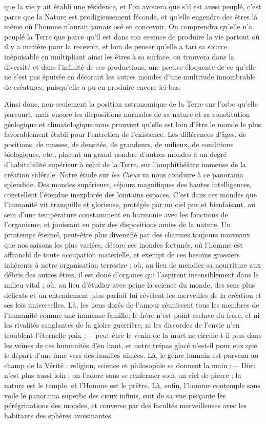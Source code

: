 \documentclass[a4paper, 11pt, oneside]{article}
\begin{document}
que la vie y ait établi une résidence, et l'on avouera que s'il est aussi peuplé, c'est parce que la Nature est prodigieusement féconde, et qu'elle engendre des êtres là même où l'homme n'aurait jamais osé en concevoir. On comprendra qu'elle n'a peuplé la Terre que parce qu'il est dans son essence de produire la vie partout où il y a matière pour la recevoir, et loin de penser qu'elle a tari sa source inépuisable en multipliant ainsi les êtres à sa surface, on trouvera dans la diversité et dans l'infinité de ses productions, une preuve éloquente de ce qu'elle ne s'est pas épuisée en décorant les autres mondes d'une multitude innombrable de créatures, puisqu'elle a pu en produire encore ici-bas.

Ainsi donc, non-seulement la position astronomique de la Terre sur l'orbe qu'elle parcourt, mais encore les dispositions normales de sa nature et sa constitution géologique et climatologique nous prouvent qu'elle est loin d'être le monde le plus favorablement établi pour l'entretien de l'existence. Les différences d'âges, de positions, de masses, de densités, de grandeurs, de milieux, de conditions biologiques, etc., placent un grand nombre d'autres mondes à un degré d'habitabilité supérieur à celui de la Terre, sur l'amphithéâtre immense de la création sidérale. Notre étude sur \emph{les Cieux} va nous conduire à ce panorama splendide. Des mondes supérieurs, séjours magnifiques des hautes intelligences, constellent l'étendue inexplorée des lointains espaces. C'est dans ces mondes que l'humanité vit tranquille et glorieuse, protégée par un ciel pur et bienfaisant, au sein d'une température constamment en harmonie avec les fonctions de l'organisme, et jouissant en paix des dispositions amies de la nature. Un printemps éternel, peut-être plus diversifié par des charmes toujours nouveaux que nos saisons les plus variées, décore ces inondes fortunés, où l'homme est affranchi de toute occupation matérielle, et exempt de ces besoins grossiers inhérents à notre organisation terrestre ; où, au lieu de mendier sa nourriture aux débris des autres êtres, il est doué d'organes qui l'aspirent insensiblement dans le milieu vital ; où, au lieu d'étudier avec peine la science du monde, des sens plus délicats et un entendement plus parfait lui révèlent les merveilles de la création et ses lois universelles. Là, les liens dorés de l'amour réunissent tous les membres de l'humanité comme une immense famille, le frère n'est point esclave du frère, et ni les rivalités sanglantes de la gloire guerrière, ni les discordes de l'envie n'en troublent l'éternelle paix ;--- peut-être le venin de la mort ne circule-t-il plus dans les veines de ces humanités d'en haut, et notre trépas glacé n'est-il pour eux que le départ d'une âme vers des familles aimées. Là, le genre humain est parvenu au champ de la Vérité : religion, science et philosophie se donnent la main ;--- Dieu n'est plus aussi loin : on l'adore sans se renfermer sous un ciel de pierre ; la nature est le temple, et l'Homme est le prêtre. Là, enfin, l'homme contemple sans voile le panorama superbe des cieux infinis, suit de sa vue perçante les pérégrinations des mondes, et converse par des facultés merveilleuses avec les habitants des sphères avoisinantes.
\clearpage
\end{document}
